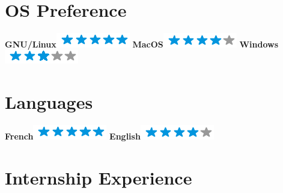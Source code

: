\documentclass[]{friggeri-cv}
\begin{document}
\begin{aside}
~
~
~
  \section{OS Preference}
    \textbf{GNU/Linux}\includegraphics[scale=0.40]{img/5stars.png}
    \textbf{MacOS}\includegraphics[scale=0.40]{img/4stars.png}
    \textbf{Windows}\includegraphics[scale=0.40]{img/3stars.png}
    ~
  \section{Languages}
    \textbf{French}\includegraphics[scale=0.40]{img/5stars.png}
    \textbf{English}\includegraphics[scale=0.40]{img/4stars.png}
    ~
\end{aside}


\section{Internship Experience}
\end{document}
